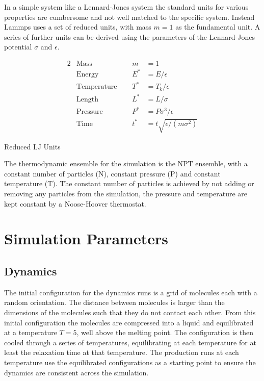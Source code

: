 In a simple system like a Lennard-Jones system the standard units for various properties are cumbersome and not well matched to the specific system. Instead Lammps uses a set of reduced units, with mass $m = 1$ as the fundamental unit. A series of further units can be derived using the parameters of the Lennard-Jones potential $\sigma$ and $\epsilon$. 

\begin{table}
    \centering
    \begin{alignat*}{2}
        &\text{Mass} & m &= 1 \\
        &\text{Energy} & E^* &= E/\epsilon \\
        &\text{Temperature  }\quad& T^* &= T_k/\epsilon \\
        &\text{Length} & L^* &= L/\sigma \\
        &\text{Pressure} & P^* &= P\sigma^3/\epsilon \\
        &\text{Time} & t^* &= t\sqrt{\epsilon/(m\sigma^2)}
    \end{alignat*}
    \caption{Reduced LJ Units}
    \label{tab:reduced units}
\end{table}


The thermodynamic ensemble for the simulation is the NPT ensemble, with a constant number of particles (N), constant pressure (P) and constant temperature (T). The constant number of particles is achieved by not adding or removing any particles from the simulation, the pressure and temperature are kept constant by a Noose-Hoover thermostat\tocheck.

\section{Simulation Parameters}

\subsection{Dynamics}

The initial configuration for the dynamics runs is a grid of molecules each with a random orientation. The distance between molecules is larger than the dimensions of the molecules such that they do not contact each other. From this initial configuration the molecules are compressed into a liquid and equilibrated at a temperature $T=5$, well above the melting point. The configuration is then cooled through a series of temperatures, equilibrating at each temperature for at least the relaxation time at that temperature. The production runs at each temperature use the equilibrated configurations as a starting point to ensure the dynamics are consistent across the simulation.


